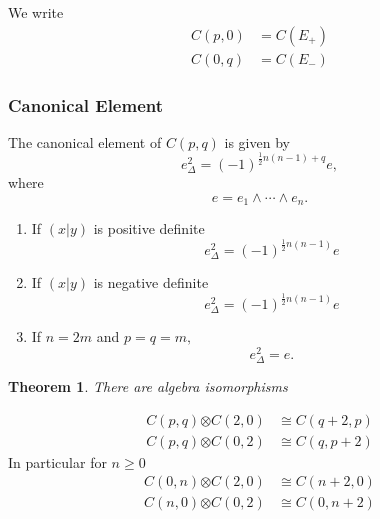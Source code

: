 \documentclass[aps,preprint]{revtex4}%
\newtheorem{theorem}{Theorem}
\begin{document}
We write
\begin{align}
C\left(  p,0\right)   &  =C\left(  E_{+}\right) \\
C\left(  0,q\right)   &  =C\left(  E_{-}\right)
\end{align}


\subsubsection{Canonical Element}

The canonical element of $C\left(  p,q\right)  $ is given by
\begin{equation}
e_{\Delta}^{2}=\left(  -1\right)  ^{\frac{1}{2}n\left(  n-1\right)  +q}e,
\end{equation}
where
\begin{equation}
e=e_{1}\wedge\cdots\wedge e_{n}.
\end{equation}


\begin{enumerate}
\item If $\left(  \left.  x\right\vert y\right)  $ is positive definite
\begin{equation}
e_{\Delta}^{2}=\left(  -1\right)  ^{\frac{1}{2}n\left(  n-1\right)  }e
\end{equation}


\item If $\left(  \left.  x\right\vert y\right)  $ is negative definite
\begin{equation}
e_{\Delta}^{2}=\left(  -1\right)  ^{\frac{1}{2}n\left(  n-1\right)  }e
\end{equation}


\item If $n=2m$ and $p=q=m,$
\begin{equation}
e_{\Delta}^{2}=e.
\end{equation}

\end{enumerate}

\begin{theorem}
There are algebra isomorphisms
\end{theorem}

%

\begin{align}
C\left(  p,q\right)  \mathbb{\otimes}C\left(  2,0\right)   &  \cong C\left(
q+2,p\right) \\
C\left(  p,q\right)  \mathbb{\otimes}C\left(  0,2\right)   &  \cong C\left(
q,p+2\right)
\end{align}
In particular for $n\geq0$
\begin{align}
C\left(  0,n\right)  \mathbb{\otimes}C\left(  2,0\right)   &  \cong C\left(
n+2,0\right) \\
C\left(  n,0\right)  \mathbb{\otimes}C\left(  0,2\right)   &  \cong C\left(
0,n+2\right)
\end{align}
\end{document}
